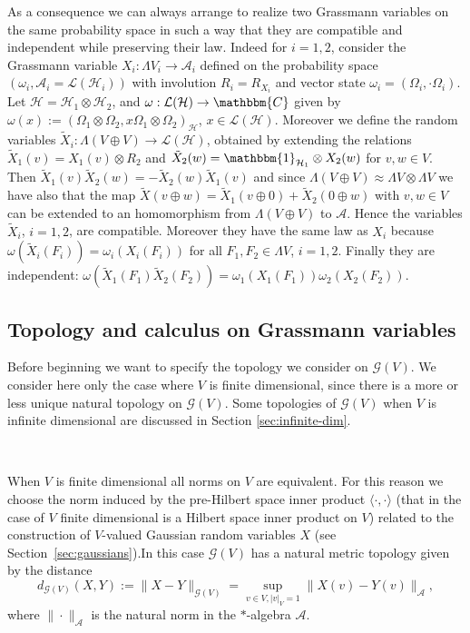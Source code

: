 \documentclass[11pt]{article}
\newcommand{\assign}{:=}
\newcommand{\asterisk}{\mathord{*}}
\begin{document}
As a consequence we can always arrange to realize two Grassmann variables on
the same probability space in such a way that they are compatible and
independent while preserving their law. Indeed for $i = 1, 2$, consider the
Grassmann variable $X_i : \Lambda V_i \rightarrow \mathcal{A}_i$ defined on
the probability space $(\omega_i, \mathcal{A}_i =\mathcal{L} (\mathcal{H}_i))$
with involution $R_i = R_{X_i}$ and vector state $\omega_i = (\Omega_i, \cdot
\Omega_i)$. Let $\mathcal{H}=\mathcal{H}_1 \otimes \mathcal{H}_2$, and $\omega
: \mathcal{L} (\mathcal{H}) \rightarrow \mathbbm{C}$ given by $\omega (x)
\assign (\Omega_1 \otimes \Omega_2, x \Omega_1 \otimes
\Omega_2)_{\mathcal{H}}$, $x \in \mathcal{L} (\mathcal{H})$. Moreover we
define the random variables $\tilde{X}_i : \Lambda (V \oplus V) \rightarrow
\mathcal{L} (\mathcal{H})$, obtained by extending the relations $\tilde{X}_1
(v) = X_1 (v) \otimes R_2$ and $\tilde{X}_2 (w) =\mathbbm{1}_{\mathcal{H}_1}
\otimes X_2 (w)$ for $v, w \in V$. Then $\tilde{X}_1 (v) \tilde{X}_2 (w) = -
\tilde{X}_2 (w) \tilde{X}_1 (v)$ and since $\Lambda (V \oplus V) \approx
\Lambda V \otimes \Lambda V$ we have also that the map $\tilde{X} (v \oplus w)
= \tilde{X}_1 (v \oplus 0) + \tilde{X}_2 (0 \oplus w)$ with $v, w \in V$ can
be extended to an homomorphism from $\Lambda (V \oplus V)$ to $\mathcal{A}$.
Hence the variables $\tilde{X}_i$, $i = 1, 2$, are compatible. Moreover they
have the same law as $X_i$ because $\omega (\tilde{X}_i (F_i)) = \omega_i (X_i
(F_i))$ for all $F_1, F_2 \in \Lambda V$, $i = 1, 2$. Finally they are
independent: $\omega (\tilde{X}_1 (F_1) \tilde{X}_2 (F_2)) = \omega_1 (X_1
(F_1)) \omega_2 (X_2 (F_2))$.

\subsection{Topology and calculus on Grassmann variables}\label{sec:top}

Before beginning we want to specify the topology we consider on $\mathcal{G}
(V)$. We consider here only the case where $V$ is finite dimensional, since
there is a more or less unique natural topology on $\mathcal{G} (V)$. Some
topologies of $\mathcal{G} (V)$ when $V$ is infinite dimensional are discussed
in Section \ref{sec:infinite-dim}.

\

When $V$ is finite dimensional all norms on $V$ are equivalent. For this
reason we choose the norm induced by the pre-Hilbert space inner product
$\langle \cdot, \cdot \rangle$ (that in the case of $V$ finite dimensional is
a Hilbert space inner product on $V$) related to the construction of
$V$-valued Gaussian random variables $X$ (see
Section~\ref{sec:gaussians}).\quad In this case $\mathcal{G} (V)$ has a
natural metric topology given by the distance
\begin{equation}
  d_{\mathcal{G} (V)} (X, Y) \assign \| X - Y \|_{\mathcal{G} (V)} = \sup_{v
  \in V, | v |_V = 1} \| X (v) - Y (v) \|_{\mathcal{A}},
  \label{eq:distrance-g}
\end{equation}
where $\| \cdot \|_{\mathcal{A}}$ is the natural norm in the
$\asterisk$-algebra $\mathcal{A}$.
\end{document}
